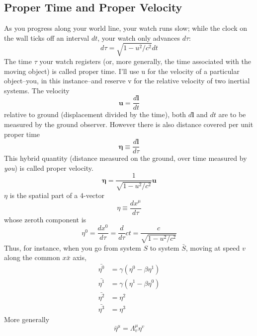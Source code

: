 \documentclass[../../main.tex]{subfiles}
\begin{document}
\subsection{Proper Time and Proper Velocity}
As you progress along your world line, your watch runs slow; while the clock on the wall ticks off an interval $dt$, your watch only advances $d\tau$:
\begin{equation*}
    d\tau=\sqrt{1 - u^2/c^2}dt
\end{equation*}
The time $\tau$ your watch registers (or, more generally, the time associated with the moving object) is called proper time. I'll use u for the velocity of a particular object--you, in this instance--and reserve v for the relative velocity of two inertial systems.  The velocity
\begin{equation*}
    \mathbf{u}=\frac{d\mathbf{l}}{dt}
\end{equation*}
relative to ground (displacement divided by the time), both $d\mathbf{l}$ and $dt$ are to be measured by the ground observer.  However there is also distance covered per unit proper time
\begin{equation*}
    \boldsymbol{\eta}\equiv \frac{d\mathbf{l}}{d\tau}
\end{equation*}
This hybrid quantity (distance measured on the ground, over time measured by \emph{you}) is called proper velocity. 
\begin{equation*}
    \boldsymbol{\eta}= \frac{1}{\sqrt{1 - u^2/c^2}}\mathbf{u}
\end{equation*}
$\eta$ is the spatial part of a 4-vector
\begin{equation*}
    \eta\equiv\frac{dx^{\mu}}{d\tau}
\end{equation*}
whose zeroth component is
\begin{equation*}
    \eta^0=\frac{dx^{0}}{d\tau}=\frac{d}{d\tau}ct=\frac{c}{\sqrt{1 - u^2/c^2}}
\end{equation*}
Thus, for instance, when you go from system $S$ to system $\bar{S}$, moving at speed $v$ along the common $x\bar{x}$ axis,
\begin{align*}
    \bar{\eta^0} &= \gamma (\eta^0 - \beta \eta^1)\\
    \bar{\eta^1} &= \gamma(\eta^1-\beta \eta^0)\\
    \bar{\eta^2} &=\eta^2\\
    \bar{\eta^3}&=\eta^3
\end{align*}
More generally
\begin{equation*}
    \bar{\eta}^{\mu}=\Lambda_{v}^{\mu}\eta^v
\end{equation*}
\end{document}
